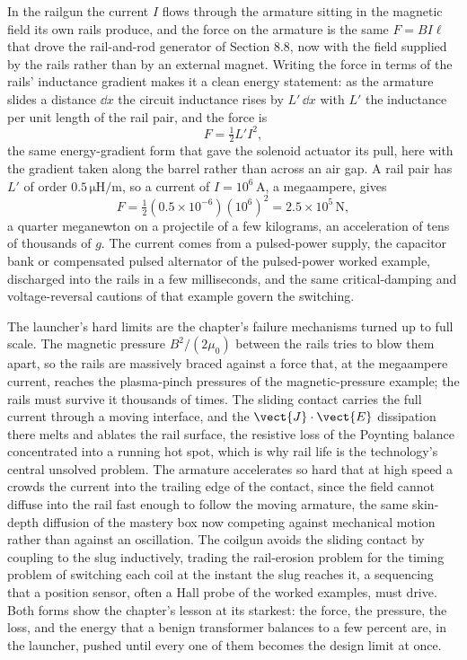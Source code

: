 In the railgun the current $I$ flows through the armature sitting in the
magnetic field its own rails produce, and the force on the armature is the
same $F = B I \ell$ that drove the rail-and-rod generator of Section 8.8,
now with the field supplied by the rails rather than by an external magnet.
Writing the force in terms of the rails' inductance gradient makes it a
clean energy statement: as the armature slides a distance $\dd x$ the
circuit inductance rises by $L'\,\dd x$ with $L'$ the inductance per unit
length of the rail pair, and the force is
\[
F = \tfrac12 L' I^{2},
\]
the same energy-gradient form that gave the solenoid actuator its pull,
here with the gradient taken along the barrel rather than across an air gap.
A rail pair has $L'$ of order $0.5\,\si{\micro\henry\per\meter}$, so a
current of $I = 10^{6}\,\si{\ampere}$, a megaampere, gives
\[
F = \tfrac12(0.5\times 10^{-6})(10^{6})^{2} = 2.5\times 10^{5}\,\si{\newton},
\]
a quarter meganewton on a projectile of a few kilograms, an acceleration of
tens of thousands of $g$. The current comes from a pulsed-power supply, the
capacitor bank or compensated pulsed alternator of the pulsed-power worked
example, discharged into the rails in a few milliseconds, and the same
critical-damping and voltage-reversal cautions of that example govern the
switching.

The launcher's hard limits are the chapter's failure mechanisms turned up
to full scale. The magnetic pressure $B^{2}/(2\mu_0)$ between the rails
tries to blow them apart, so the rails are massively braced against a force
that, at the megaampere current, reaches the plasma-pinch pressures of the
magnetic-pressure example; the rails must survive it thousands of times.
The sliding contact carries the full current through a moving interface, and
the $\vect{J}\cdot\vect{E}$ dissipation there melts and ablates the rail
surface, the resistive loss of the Poynting balance concentrated into a
running hot spot, which is why rail life is the technology's central
unsolved problem. The armature accelerates so hard that at high speed a
 crowds the current into the trailing edge of
the contact, since the field cannot diffuse into the rail fast enough to
follow the moving armature, the same skin-depth diffusion of the mastery box
now competing against mechanical motion rather than against an oscillation.
The coilgun avoids the sliding contact by coupling to the slug inductively,
trading the rail-erosion problem for the timing problem of switching each
coil at the instant the slug reaches it, a sequencing that a position sensor,
often a Hall probe of the worked examples, must drive. Both forms show the
chapter's lesson at its starkest: the force, the pressure, the loss, and the
energy that a benign transformer balances to a few percent are, in the
launcher, pushed until every one of them becomes the design limit at once.


